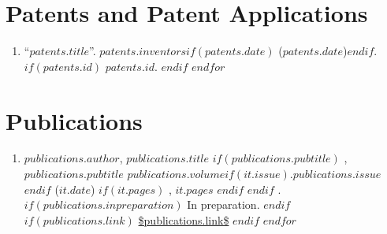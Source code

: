 \documentclass[11pt]{article}
\begin{document}
\section{Patents and Patent Applications}
\begin{enumerate}
$for(patents)$
\item ``$patents.title$''. $patents.inventors$$if(patents.date)$ ($patents.date$)$endif$.
$if(patents.id)$
$patents.id$.
$endif$
$endfor$
\end{enumerate}


\section{Publications}
\begin{enumerate}
$for(publications)$
\item $publications.author$, $publications.title$%
$if(publications.pubtitle)$
, \emph{$publications.pubtitle$}
$publications.volume$$if(it.issue)$.$publications.issue$$endif$ ($it.date$)%
$if(it.pages)$
, $it.pages$%
$endif$
$endif$
.
$if(publications.inpreparation)$
In preparation.
$endif$
$if(publications.link)$
\url{$publications.link$}
$endif$
$endfor$
\end{enumerate}
\end{document}
